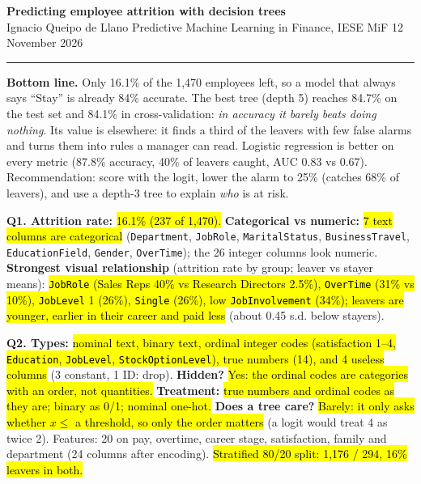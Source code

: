 \documentclass[10pt,a4paper]{article}
\newcommand{\q}[1]{\textbf{\color{blue!50!black}#1}}
\begin{document}
\small

{\large\textbf{Predicting employee attrition with decision trees}}\\
Ignacio Queipo de Llano \textperiodcentered{} Predictive Machine Learning in Finance, IESE MiF \textperiodcentered{} 12 November 2026\\[-6pt]
\rule{\linewidth}{0.4pt}

\begin{tcolorbox}[colback=white,colframe=black,boxrule=0.4pt,sharp corners,left=5pt,right=5pt,top=3pt,bottom=3pt]
\textbf{Bottom line.} Only 16.1\% of the 1,470 employees left, so a model that always says ``Stay'' is already 84\%
accurate. The best tree (depth 5) reaches 84.7\% on the test set and 84.1\% in cross-validation: \emph{in accuracy it
barely beats doing nothing}. Its value is elsewhere: it finds a third of the leavers with few false alarms and turns
them into rules a manager can read. Logistic regression is better on every metric (87.8\% accuracy, 40\% of leavers
caught, AUC 0.83 vs 0.67). Recommendation: score with the logit, lower the alarm to 25\% (catches 68\% of leavers),
and use a depth-3 tree to explain \emph{who} is at risk.
\end{tcolorbox}

\q{Q1. Attrition rate:} \hl{16.1\% (237 of 1,470).} \q{Categorical vs numeric:} \hl{7 text columns are categorical}
(\texttt{Department}, \texttt{JobRole}, \texttt{MaritalStatus}, \texttt{BusinessTravel}, \texttt{EducationField},
\texttt{Gender}, \texttt{OverTime}); the 26 integer columns look numeric. \q{Strongest visual relationship} (attrition
rate by group; leaver vs stayer means): \hl{\texttt{JobRole} (Sales Reps 40\% vs Research Directors 2.5\%),
\texttt{OverTime} (31\% vs 10\%), \texttt{JobLevel} 1 (26\%), \texttt{Single} (26\%), low \texttt{JobInvolvement}
(34\%); leavers are younger, earlier in their career and paid less} (about 0.45 s.d. below stayers).

\q{Q2. Types:} \hl{nominal text, binary text, ordinal integer codes (satisfaction 1--4, \texttt{Education},
\texttt{JobLevel}, \texttt{StockOptionLevel}), true numbers (14), and 4 useless columns} (3 constant, 1 ID: drop).
\q{Hidden?} \hl{Yes: the ordinal codes are categories with an order, not quantities.} \q{Treatment:} \hl{true numbers and
ordinal codes as they are; binary as 0/1; nominal one-hot.} \q{Does a tree care?} \hl{Barely: it only asks whether
$x \le$ a threshold, so only the order matters} (a logit would treat 4 as twice 2). Features: 20 on pay, overtime,
career stage, satisfaction, family and department (24 columns after encoding). \hl{Stratified 80/20 split: 1,176 / 294,
16\% leavers in both.}
\end{document}
